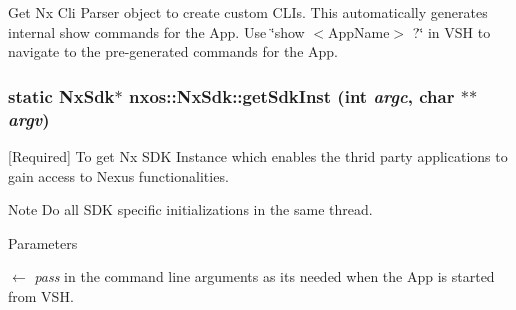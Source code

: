 \label{classnxos_1_1NxSdk_a98bcb70d1bf60e38b41eacdf0a72dc89}
Get Nx Cli Parser object to create custom CLIs. This automatically generates internal show commands for the App. Use \char`\"{}show $<$AppName$>$ ?\char`\"{} in VSH to navigate to the pre-\/generated commands for the App. \hypertarget{classnxos_1_1NxSdk_a5050e2d26c40744b4fc7862068a83f39}{
\subsubsection[{getSdkInst}]{\setlength{\rightskip}{0pt plus 5cm}static {\bf NxSdk}$\ast$ nxos::NxSdk::getSdkInst (int {\em argc}, \/  char $\ast$$\ast$ {\em argv})}}
\label{classnxos_1_1NxSdk_a5050e2d26c40744b4fc7862068a83f39}
\mbox{[}Required\mbox{]} To get Nx SDK Instance which enables the thrid party applications to gain access to Nexus functionalities. \begin{DoxyNote}{Note}
Do all SDK specific initializations in the same thread. 
\end{DoxyNote}

\begin{DoxyParams}{Parameters}
\item[\mbox{$\leftarrow$} {\em pass}]in the command line arguments as its needed when the App is started from VSH.\end{DoxyParams}

